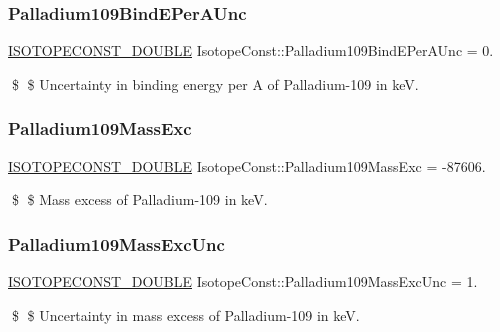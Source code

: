 \subsubsection{\texorpdfstring{Palladium109\+Bind\+E\+Per\+A\+Unc}{Palladium109BindEPerAUnc}}
{\footnotesize\ttfamily \mbox{\hyperlink{group___isotope_const-_macros_ga8f45a7272ce02c0b4c65c44636ed719a}{I\+S\+O\+T\+O\+P\+E\+C\+O\+N\+S\+T\+\_\+\+D\+O\+U\+B\+LE}} Isotope\+Const\+::\+Palladium109\+Bind\+E\+Per\+A\+Unc = 0.}

\$ \$ Uncertainty in binding energy per A of Palladium-\/109 in keV. \mbox{\label{group___isotope_const-_palladium-_pd109_ga93f66f37f5b138a3b4503f09e0d504a3}} 
\subsubsection{\texorpdfstring{Palladium109\+Mass\+Exc}{Palladium109MassExc}}
{\footnotesize\ttfamily \mbox{\hyperlink{group___isotope_const-_macros_ga8f45a7272ce02c0b4c65c44636ed719a}{I\+S\+O\+T\+O\+P\+E\+C\+O\+N\+S\+T\+\_\+\+D\+O\+U\+B\+LE}} Isotope\+Const\+::\+Palladium109\+Mass\+Exc = -\/87606.}

\$ \$ Mass excess of Palladium-\/109 in keV. \mbox{\label{group___isotope_const-_palladium-_pd109_gacf0a0dca6d6cc215987e85f1b2c80afe}} 
\subsubsection{\texorpdfstring{Palladium109\+Mass\+Exc\+Unc}{Palladium109MassExcUnc}}
{\footnotesize\ttfamily \mbox{\hyperlink{group___isotope_const-_macros_ga8f45a7272ce02c0b4c65c44636ed719a}{I\+S\+O\+T\+O\+P\+E\+C\+O\+N\+S\+T\+\_\+\+D\+O\+U\+B\+LE}} Isotope\+Const\+::\+Palladium109\+Mass\+Exc\+Unc = 1.}

\$ \$ Uncertainty in mass excess of Palladium-\/109 in keV. \mbox{\label{group___isotope_const-_palladium-_pd109_ga9bf6c326c3f4e1c31c985fc0b7a30a86}} 
